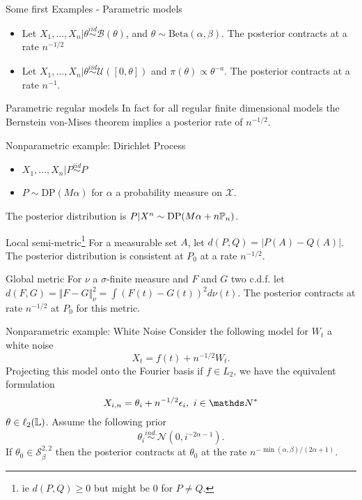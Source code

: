 \begin{frame}{Some first Examples - Parametric models}
\begin{itemize}[<+->]
\item Let $X_1, \dots, X_n |\theta \overset{iid}{\sim} \mathcal{B}(\theta) $, and $\theta\sim \text{Beta}(\alpha,\beta)$. The posterior contracts at a rate $n^{-1/2}$
\item Let $X_1,\dots, X_n|\theta \overset{iid}{\sim} \mathcal{U}([0,\theta])$ and $\pi(\theta) \propto \theta^{-a}$. The posterior contracts at a rate $n^{-1}$.
\end{itemize}
\pause 
\begin{block}{Parametric regular models}
In fact for all regular finite dimensional models the \alert{Bernstein von-Mises} theorem implies a posterior rate of $n^{-1/2}$. 
\end{block}
\end{frame}

\begin{frame}{Nonparametric example: Dirichlet Process}

\begin{itemize}
\item $X_1, \dots, X_n | P \overset{iid}{\sim} P $ 
\item $P\sim \text{DP}(M\alpha)$ for $\alpha$ a probability measure on $\mathcal{X}$. 
\end{itemize}

The posterior distribution is $P|X^n \sim \text{DP}(M\alpha + n\mathbb{P}_n)$. 
\pause 
\begin{block}{Local semi-metric\footnote{ie $d(P,Q) \geq 0$ but might be 0 for $P\neq Q$.}}
For a measurable set $A$, let $d(P,Q) = |P(A) - Q(A)|$. The posterior distribution is consistent at $P_0$ at a rate $n^{-1/2}$.  
\end{block}
\pause 

\begin{block}{Global metric}
For $\nu$ a $\sigma$-finite measure and $F$ and $G$ two c.d.f. let $d(F,G) = \Vert F-G\Vert_\nu^2 = \int (F(t) - G(t))^2 d\nu(t)$. The posterior contracts at rate $n^{-1/2}$ at $P_0$ for this metric. 
\end{block}

\end{frame}


\begin{frame}{Nonparametric example: White Noise}
Consider the following model for $W_t$ a white noise
$$
X_t = f(t) + n^{-1/2}W_t.
$$
Projecting this model onto the Fourier basis if $f\in L_2$, we have the equivalent formulation
$$
X_{i,n} = \theta_i + n^{-1/2} \epsilon_i,~ i \in \N^* 
$$
$\theta \in \ell_2(\mathbb{L})$. Assume the following prior 
$$
\theta_i \overset{ind.}{\sim} \mathcal{N}(0, i^{-2\alpha - 1}).  
$$ 
If $\theta_0 \in \mathcal{S}_\beta^{2,2}$ then the posterior contracts at $\theta_0$ at the rate $n^{-\min(\alpha,\beta)/(2\alpha + 1)}$. 
\end{frame}

